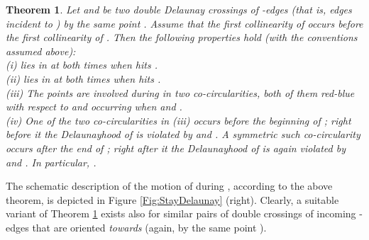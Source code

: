 \documentclass[letter,11pt]{article}
\newtheorem{theorem}{Theorem}[section]
\begin{document}
\begin{theorem}\label{Thm:OrderSpecialCrossings}
Let  and  be two double Delaunay crossings of -edges (that is, edges incident to )  by the same point . 
Assume that
the first collinearity of  occurs before the first collinearity of .
Then the following properties hold (with the conventions assumed above):\\
\indent(i)  lies in  at both times when  hits .\\
\indent (ii)  lies in  at both times when  hits .\\
\indent (iii) The points  are involved during  in two co-circularities, both of them red-blue with respect to  and occurring when  and . \\
\indent (iv) One of the two co-circularities in (iii) occurs before the beginning of ; right before it the Delaunayhood of  is violated by  and . A symmetric such co-circularity occurs after the end of ;
right after it the Delaunayhood of  is again violated by  and .
In particular, .
\end{theorem}
The schematic description of the motion of  during , according to the above theorem, is depicted in Figure \ref{Fig:StayDelaunay} (right).
Clearly, a suitable variant of Theorem \ref{Thm:OrderSpecialCrossings} exists also for similar pairs of double crossings of incoming -edges  that are oriented {\it towards}  (again, by the same point ).
\end{document}
